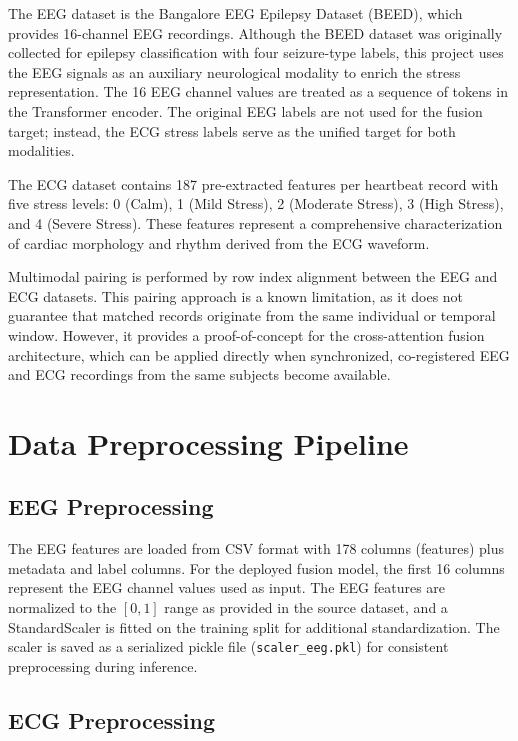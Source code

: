 \documentclass[12pt,letterpaper]{report}
\begin{document}
The EEG dataset is the Bangalore EEG Epilepsy Dataset (BEED), which provides 16-channel EEG recordings. Although the BEED dataset was originally collected for epilepsy classification with four seizure-type labels, this project uses the EEG signals as an auxiliary neurological modality to enrich the stress representation. The 16 EEG channel values are treated as a sequence of tokens in the Transformer encoder. The original EEG labels are not used for the fusion target; instead, the ECG stress labels serve as the unified target for both modalities.

The ECG dataset contains 187 pre-extracted features per heartbeat record with five stress levels: 0 (Calm), 1 (Mild Stress), 2 (Moderate Stress), 3 (High Stress), and 4 (Severe Stress). These features represent a comprehensive characterization of cardiac morphology and rhythm derived from the ECG waveform.

Multimodal pairing is performed by row index alignment between the EEG and ECG datasets. This pairing approach is a known limitation, as it does not guarantee that matched records originate from the same individual or temporal window. However, it provides a proof-of-concept for the cross-attention fusion architecture, which can be applied directly when synchronized, co-registered EEG and ECG recordings from the same subjects become available.

\section{Data Preprocessing Pipeline}
\label{sec:preprocessing}

\subsection{EEG Preprocessing}
\label{subsec:eeg_preprocess}

The EEG features are loaded from CSV format with 178 columns (features) plus metadata and label columns. For the deployed fusion model, the first 16 columns represent the EEG channel values used as input. The EEG features are normalized to the $[0, 1]$ range as provided in the source dataset, and a StandardScaler is fitted on the training split for additional standardization. The scaler is saved as a serialized pickle file (\texttt{scaler\_eeg.pkl}) for consistent preprocessing during inference.

\subsection{ECG Preprocessing}
\label{subsec:ecg_preprocess}
\end{document}
